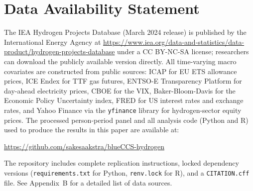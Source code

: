 \documentclass[review,authoryear,11pt]{elsarticle}
\begin{document}
\section*{Data Availability Statement}

The IEA Hydrogen Projects Database (March 2024 release) is published by the International Energy Agency at \url{https://www.iea.org/data-and-statistics/data-product/hydrogen-projects-database} under a CC BY-NC-SA license; researchers can download the publicly available version directly. All time-varying macro covariates are constructed from public sources: ICAP for EU ETS allowance prices, ICE Endex for TTF gas futures, ENTSO-E Transparency Platform for day-ahead electricity prices, CBOE for the VIX, Baker-Bloom-Davis for the Economic Policy Uncertainty index, FRED for US interest rates and exchange rates, and Yahoo Finance via the \texttt{yfinance} library for hydrogen-sector equity prices. The processed person-period panel and all analysis code (Python and R) used to produce the results in this paper are available at:

\begin{center}
\url{https://github.com/sakesaakstra/blueCCS-hydrogen}
\end{center}

The repository includes complete replication instructions, locked dependency versions (\texttt{requirements.txt} for Python, \texttt{renv.lock} for R), and a \texttt{CITATION.cff} file. See Appendix~B for a detailed list of data sources.
\end{document}
